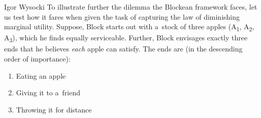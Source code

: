 \begin{artengenv}{Igor Wysocki}
To illustrate further the dilemma the Blockean framework faces, let us test how it fares when given the task of capturing the law of diminishing marginal utility. Suppose, Block starts out with a~stock of three apples (A\textsubscript{1}, A\textsubscript{2}, A\textsubscript{3}), which he finds equally serviceable. Further, Block envisages exactly three ends that he believes \textit{each} apple can satisfy. The ends are (in the descending order of importance):



\begin{enumerate}

\item Eating an apple

\item Giving it to a~friend

\item Throwing it for distance

\end{enumerate}


\end{artengenv}
